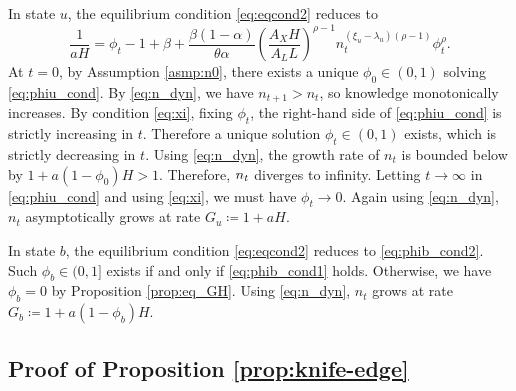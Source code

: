 \documentclass[a4paper,12pt]{article}
\numberwithin{equation}{section}
\theoremstyle{plain}
\begin{document}
In state $u$, the equilibrium condition \eqref{eq:eqcond2} reduces to
\begin{equation}
    \frac{1}{aH}=\phi_t-1+\beta+\frac{\beta(1-\alpha)}{\theta\alpha}\left(\frac{A_XH}{A_LL}\right)^{\rho-1}n_t^{(\xi_u-\lambda_u)(\rho-1)}\phi_t^\rho. \label{eq:phiu_cond}
\end{equation}
At $t=0$, by Assumption \ref{asmp:n0}, there exists a unique $\phi_0\in (0,1)$ solving \eqref{eq:phiu_cond}. By \eqref{eq:n_dyn}, we have $n_{t+1}>n_t$, so knowledge monotonically increases. By condition \eqref{eq:xi}, fixing $\phi_t$, the right-hand side of \eqref{eq:phiu_cond} is strictly increasing in $t$. Therefore a unique solution $\phi_t\in (0,1)$ exists, which is strictly decreasing in $t$. Using \eqref{eq:n_dyn}, the growth rate of $n_t$ is bounded below by $1+a(1-\phi_0)H>1$. Therefore, $\set{n_t}$ diverges to infinity. Letting $t\to\infty$ in \eqref{eq:phiu_cond} and using \eqref{eq:xi}, we must have $\phi_t\to 0$. Again using \eqref{eq:n_dyn}, $n_t$ asymptotically grows at rate $G_u\coloneqq 1+aH$.

In state $b$, the equilibrium condition \eqref{eq:eqcond2} reduces to \eqref{eq:phib_cond2}. Such $\phi_b\in (0,1]$ exists if and only if \eqref{eq:phib_cond1} holds. Otherwise, we have $\phi_b=0$ by Proposition \ref{prop:eq_GH}. Using \eqref{eq:n_dyn}, $n_t$ grows at rate $G_b\coloneqq 1+a(1-\phi_b)H$. \hfill \qedsymbol

\subsection{Proof of Proposition \ref{prop:knife-edge}}
\end{document}
